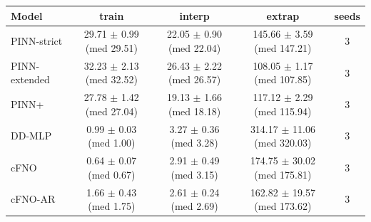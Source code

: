 \begin{tabular}{lcccc}
\toprule
Model & train & interp & extrap & seeds \\
\midrule
PINN-strict & 29.71 $\pm$ 0.99 (med 29.51) & 22.05 $\pm$ 0.90 (med 22.04) & 145.66 $\pm$ 3.59 (med 147.21) & 3 \\
PINN-extended & 32.23 $\pm$ 2.13 (med 32.52) & 26.43 $\pm$ 2.22 (med 26.57) & 108.05 $\pm$ 1.17 (med 107.85) & 3 \\
PINN+ & 27.78 $\pm$ 1.42 (med 27.04) & 19.13 $\pm$ 1.66 (med 18.18) & 117.12 $\pm$ 2.29 (med 115.94) & 3 \\
DD-MLP & 0.99 $\pm$ 0.03 (med 1.00) & 3.27 $\pm$ 0.36 (med 3.28) & 314.17 $\pm$ 11.06 (med 320.03) & 3 \\
cFNO & 0.64 $\pm$ 0.07 (med 0.67) & 2.91 $\pm$ 0.49 (med 3.15) & 174.75 $\pm$ 30.02 (med 175.81) & 3 \\
cFNO-AR & 1.66 $\pm$ 0.43 (med 1.75) & 2.61 $\pm$ 0.24 (med 2.69) & 162.82 $\pm$ 19.57 (med 173.62) & 3 \\
\bottomrule
\end{tabular}
